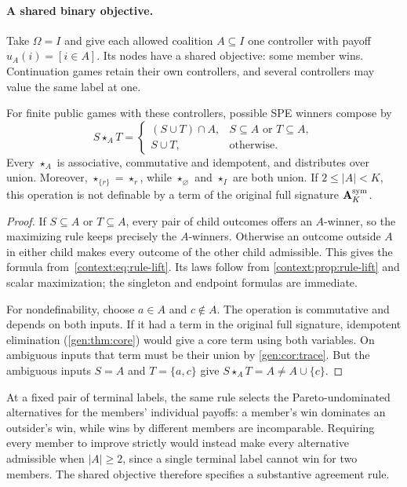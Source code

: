 \paragraph{A shared binary objective.}
Take $\Omega=I$ and give each allowed coalition $A\subseteq I$ one
controller with payoff $u_A(i)=[i\in A]$. Its nodes have a shared
objective: some member wins. Continuation games retain their own
controllers, and several controllers may value the same label at one.

\begin{proposition}\label{context:prop:collective}
For finite public games with these controllers, possible SPE winners
compose by
\begin{equation}\label{context:eq:collective}
 S\star_A T=
 \begin{cases}
 (S\cup T)\cap A,&S\subseteq A\text{ or }T\subseteq A,\\
 S\cup T,&\text{otherwise}.
 \end{cases}
\end{equation}
Every $\star_A$ is associative, commutative and idempotent, and
distributes over union. Moreover,
$\star_{\{r\}}=\star_r$, while $\star_\varnothing$ and
$\star_I$ are both union. If $2\leq|A|<K$, this operation is not
definable by a term of the original full signature
$\mathbf A_K^{\rm sym}$.
\end{proposition}
\begin{proof}
If $S\subseteq A$ or $T\subseteq A$, every pair of child outcomes
offers an $A$-winner, so the maximizing rule keeps precisely the
$A$-winners. Otherwise an outcome outside $A$ in either child makes
every outcome of the other child admissible. This gives the formula
from~\eqref{context:eq:rule-lift}. Its laws follow from
\cref{context:prop:rule-lift} and scalar maximization; the singleton
and endpoint formulas are immediate.

For nondefinability, choose $a\in A$ and $c\notin A$. The operation
is commutative and depends on both inputs. If it had a term in the
original full signature, idempotent elimination
(\cref{gen:thm:core}) would give a core term using both variables.
On ambiguous inputs that term must be their union by
\cref{gen:cor:trace}. But the ambiguous inputs $S=A$ and
$T=\{a,c\}$ give $S\star_A T=A\ne A\cup\{c\}$.
\end{proof}

At a fixed pair of terminal labels, the same rule selects the
Pareto-undominated alternatives for the members' individual payoffs:
a member's win dominates an outsider's win, while wins by different
members are incomparable. Requiring every member to improve strictly
would instead make every alternative admissible when $|A|\geq2$,
since a single terminal label cannot win for two members. The shared
objective therefore specifies a substantive agreement rule.

